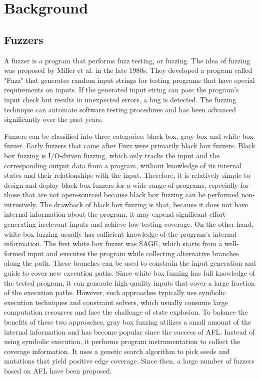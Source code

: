 

\chapter{\label{cha:background}Background}


\section{Fuzzers}
A fuzzer is a program that performs fuzz testing, or fuzzing. The idea of fuzzing was proposed by Miller et al. \cite{millerFuzzer} in the late 1980s. They developed a program called "Fuzz" that generates random input strings for testing programs that have special requirements on inputs. If the generated input string can pass the program's input check but results in unexpected errors, a bug is detected. The fuzzing technique can automate software testing procedures and has been advanced significantly over the past years.

Fuzzers can be classified into three categories: black box, gray box and white box fuzzer. Early fuzzers that came after Fuzz were primarily black box fuzzers. Black box fuzzing is I/O-driven fuzzing, which only tracks the input and the corresponding output data from a program, without knowledge of its internal states and their relationships with the input. Therefore, it is relatively simple to design and deploy black box fuzzers for a wide range of programs, especially for those that are not open-sourced because black box fuzzing can be performed non-intrusively. The drawback of black box fuzzing is that, because it does not have internal information about the program, it may expend significant effort generating irrelevant inputs and achieve low testing coverage. On the other hand, white box fuzzing usually has sufficient knowledge of the program's internal information. The first white box fuzzer was SAGE\cite{sage}, which starts from a well-formed input and executes the program while collecting alternative branches along the path. These branches can be used to constrain the input generation and  guide to cover new execution paths. Since white box fuzzing has full knowledge of the tested program, it can generate high-quality inputs that cover a large fraction of the execution paths. However, such approaches typically use symbolic execution techniques and constraint solvers, which usually consume large computation resources and face the challenge of state explosion. To balance the benefits of these two approaches, gray box fuzzing utilizes a small amount of the internal information and has become popular since the success of AFL\cite{afl}. Instead of using symbolic execution, it performs program instrumentation to collect the coverage information. It uses a genetic search algorithm to pick seeds and mutations that yield positive edge coverage. Since then, a large number of fuzzers based on AFL have been proposed\cite{TriforceAFL, kAFL, Driller, CollAFL}.



